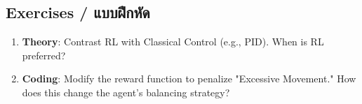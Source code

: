 \subsection{Exercises \quad / \quad \textthai{แบบฝึกหัด}}
\begin{enumerate}
    \item \textbf{Theory}: Contrast RL with Classical Control (e.g., PID). When is RL preferred?
    \item \textbf{Coding}: Modify the reward function to penalize "Excessive Movement." How does this change the agent's balancing strategy?
\end{enumerate}
